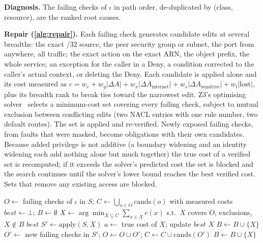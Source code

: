 \documentclass[conference]{IEEEtran}
\begin{document}
\textbf{Diagnosis.} The failing checks of $\iota$ in path order, de-duplicated by (class, resource), are the ranked root causes.

\textbf{Repair (\cref{alg:repair}).} Each failing check generates candidate edits at several breadths: the exact /32 source,
the peer security group or subnet, the port from anywhere, all traffic; the exact action on the exact ARN, the object prefix,
the whole service; an exception for the caller in a Deny, a condition corrected to the caller's actual context, or deleting
the Deny. Each candidate is applied alone and its cost measured as
$c = w_e + w_g |\Delta A| + w_x |\Delta A_{\mathrm{internet}}| + w_s |\Delta A_{\mathrm{sensitive}}| + w_l |\mathrm{lost}|$,
plus its breadth rank to break ties toward the narrowest edit. Z3's optimising solver~\cite{demoura2008z3,bjorner2015nuz}
selects a minimum-cost set covering every failing check, subject to mutual exclusion between conflicting edits (two NACL
entries with one rule number, two default routes). The set is applied and re-verified. Newly exposed failing checks, from
faults that were masked, become obligations with their own candidates. Because added privilege is not additive (a boundary
widening and an identity widening each add nothing alone but much together) the true cost of a verified set is recomputed;
if it exceeds the solver's predicted cost the set is blocked and the search continues until the solver's lower bound reaches
the best verified cost. Sets that remove any existing access are blocked.

\begin{algorithm}[t]\small
\caption{Counterexample-guided least-privilege repair}\label{alg:repair}
\begin{algorithmic}[1]
\State $O \gets$ failing checks of $\iota$ in $S$; $C \gets \bigcup_{o \in O} \mathrm{cands}(o)$ with measured costs
\State $\mathit{best} \gets \bot$; $B \gets \emptyset$ 
\Loop
  \State $X \gets \arg\min_{X \subseteq C} \sum_{x \in X} c(x)$ s.t.\ $X$ covers $O$, exclusions, $X \notin B$ 
   \Return $\mathit{best}$ \EndIf
  \State $S' \gets \mathrm{apply}(S, X)$
     \State $a \gets$ true cost of $X$; update $\mathit{best}$
      \Return $X$ \EndIf
     \State $B \gets B \cup \{X\}$
  \Else
     \State $O' \gets$ new failing checks in $S'$; $O \gets O \cup O'$; $C \gets C \cup \mathrm{cands}(O')$
      $B \gets B \cup \{X\}$ \EndIf
  \EndIf
\EndLoop
\end{algorithmic}
\end{algorithm}
\end{document}
